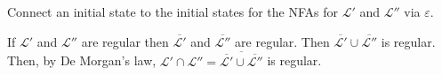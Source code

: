 \documentclass{notes}
\begin{document}
\begin{prf}
  \begin{oldenumerate}[topsep = 0ex, label = {(\alph*)}]
    \item Connect an initial state to the initial states for the NFAs for $\mathcal L'$ and $\mathcal L''$ via $\varepsilon$.
      
    \item If $\mathcal L'$ and $\mathcal L''$ are regular then $\overline{\mathcal L'}$ and $\overline{\mathcal L''}$ are regular.
    Then $\overline{\mathcal L'} \cup \overline{\mathcal L''}$ is regular.
    Then, by De Morgan's law, $\mathcal L' \cap \mathcal L'' = \overline{\overline{\mathcal L'} \cup \overline{\mathcal L''}}$ is regular.
  \end{oldenumerate}
\end{prf}

\newpage
\end{document}
